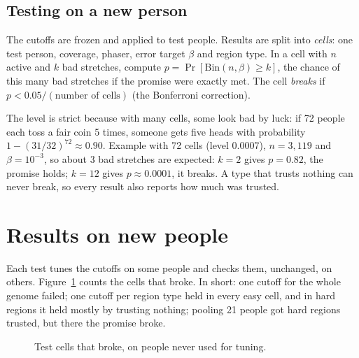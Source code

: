 \documentclass[11pt]{article}
\newcommand{\Bin}{\mathrm{Bin}}
\newcommand{\failbar}[5]{%
  \node[anchor=east,font=\scriptsize,align=right] at (-0.03,#1) {#2};
  \fill[gray!20] (0,#1-0.13) rectangle (1,#1+0.13);
  \fill[#5] (0,#1-0.13) rectangle ({max(#3,0.008)},#1+0.13);
  \node[anchor=west,font=\scriptsize\bfseries,text=#5] at (1.03,#1) {#4};}
\begin{document}
\subsection{Testing on a new person}

The cutoffs are frozen and applied to test people. Results are split into
\emph{cells}: one test person, coverage, phaser, error target $\beta$ and
region type. In a cell with $n$ active and $k$ bad stretches, compute
$p=\Pr[\Bin(n,\beta)\ge k]$, the chance of this many bad stretches if the
promise were exactly met. The cell \emph{breaks} if
$p<0.05/(\text{number of cells})$ (the Bonferroni correction).

The level is strict because with many cells, some look bad by luck: if 72 people
each toss a fair coin 5 times, someone gets five heads with probability
$1-(31/32)^{72}\approx 0.90$. Example with 72 cells (level 0.0007),
$n=3{,}119$ and $\beta=10^{-3}$, so about 3 bad stretches are expected:
$k=2$ gives $p=0.82$, the promise holds; $k=12$ gives $p\approx0.0001$, it
breaks. A type that trusts nothing can never break, so every result also
reports how much was trusted.

\section{Results on new people}\label{sec:held}

Each test tunes the cutoffs on some people and checks them, unchanged, on
others. Figure~\ref{fig:bars} counts the cells that broke. In short: one
cutoff for the whole genome failed; one cutoff per region type held in every
easy cell, and in hard regions it held mostly by trusting nothing; pooling 21
people got hard regions trusted, but there the promise broke.

\begin{figure}[h]
\centering
{}
\caption{Test cells that broke, on people never used for tuning.}
\label{fig:bars}
\end{figure}
\end{document}
